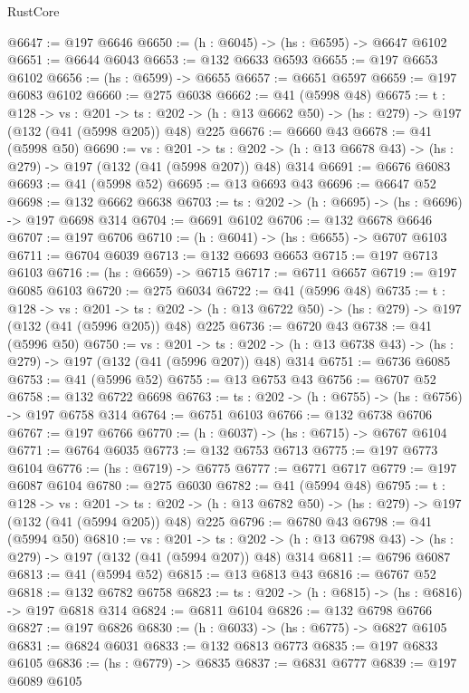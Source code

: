 \begin{lexlean}{RustCore}
\begin{coremodule}
@6647 := @197 @6646
@6650 := (h : @6045) -> (hs : @6595) -> @6647 @6102
@6651 := @6644 @6043
@6653 := @132 @6633 @6593
@6655 := @197 @6653 @6102
@6656 := (hs : @6599) -> @6655
@6657 := @6651 @6597
@6659 := @197 @6083 @6102
@6660 := @275 @6038
@6662 := @41 (@5998 @48)
@6675 := {t : @128} ->
  {vs : @201} ->
  {ts : @202} -> (h : @13 @6662 @50) -> (hs : @279) -> @197 (@132 (@41 (@5998 @205)) @48) @225
@6676 := @6660 @43
@6678 := @41 (@5998 @50)
@6690 := {vs : @201} ->
  {ts : @202} -> (h : @13 @6678 @43) -> (hs : @279) -> @197 (@132 (@41 (@5998 @207)) @48) @314
@6691 := @6676 @6083
@6693 := @41 (@5998 @52)
@6695 := @13 @6693 @43
@6696 := @6647 @52
@6698 := @132 @6662 @6638
@6703 := {ts : @202} -> (h : @6695) -> (hs : @6696) -> @197 @6698 @314
@6704 := @6691 @6102
@6706 := @132 @6678 @6646
@6707 := @197 @6706
@6710 := (h : @6041) -> (hs : @6655) -> @6707 @6103
@6711 := @6704 @6039
@6713 := @132 @6693 @6653
@6715 := @197 @6713 @6103
@6716 := (hs : @6659) -> @6715
@6717 := @6711 @6657
@6719 := @197 @6085 @6103
@6720 := @275 @6034
@6722 := @41 (@5996 @48)
@6735 := {t : @128} ->
  {vs : @201} ->
  {ts : @202} -> (h : @13 @6722 @50) -> (hs : @279) -> @197 (@132 (@41 (@5996 @205)) @48) @225
@6736 := @6720 @43
@6738 := @41 (@5996 @50)
@6750 := {vs : @201} ->
  {ts : @202} -> (h : @13 @6738 @43) -> (hs : @279) -> @197 (@132 (@41 (@5996 @207)) @48) @314
@6751 := @6736 @6085
@6753 := @41 (@5996 @52)
@6755 := @13 @6753 @43
@6756 := @6707 @52
@6758 := @132 @6722 @6698
@6763 := {ts : @202} -> (h : @6755) -> (hs : @6756) -> @197 @6758 @314
@6764 := @6751 @6103
@6766 := @132 @6738 @6706
@6767 := @197 @6766
@6770 := (h : @6037) -> (hs : @6715) -> @6767 @6104
@6771 := @6764 @6035
@6773 := @132 @6753 @6713
@6775 := @197 @6773 @6104
@6776 := (hs : @6719) -> @6775
@6777 := @6771 @6717
@6779 := @197 @6087 @6104
@6780 := @275 @6030
@6782 := @41 (@5994 @48)
@6795 := {t : @128} ->
  {vs : @201} ->
  {ts : @202} -> (h : @13 @6782 @50) -> (hs : @279) -> @197 (@132 (@41 (@5994 @205)) @48) @225
@6796 := @6780 @43
@6798 := @41 (@5994 @50)
@6810 := {vs : @201} ->
  {ts : @202} -> (h : @13 @6798 @43) -> (hs : @279) -> @197 (@132 (@41 (@5994 @207)) @48) @314
@6811 := @6796 @6087
@6813 := @41 (@5994 @52)
@6815 := @13 @6813 @43
@6816 := @6767 @52
@6818 := @132 @6782 @6758
@6823 := {ts : @202} -> (h : @6815) -> (hs : @6816) -> @197 @6818 @314
@6824 := @6811 @6104
@6826 := @132 @6798 @6766
@6827 := @197 @6826
@6830 := (h : @6033) -> (hs : @6775) -> @6827 @6105
@6831 := @6824 @6031
@6833 := @132 @6813 @6773
@6835 := @197 @6833 @6105
@6836 := (hs : @6779) -> @6835
@6837 := @6831 @6777
@6839 := @197 @6089 @6105

\end{coremodule}
\end{lexlean}
